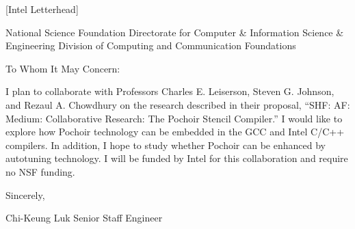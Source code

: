 [Intel Letterhead]

National Science Foundation
Directorate for Computer & Information Science & Engineering 
Division of Computing and Communication Foundations

To Whom It May Concern:

I plan to collaborate with Professors Charles E. Leiserson, Steven
G. Johnson, and Rezaul A. Chowdhury on the research described in their
proposal, ``SHF: AF: Medium: Collaborative Research: The Pochoir
Stencil Compiler.''  I would like to explore how Pochoir technology
can be embedded in the GCC and Intel C/C++ compilers.  In addition, I
hope to study whether Pochoir can be enhanced by autotuning
technology.  I will be funded by Intel for this collaboration and
require no NSF funding.

Sincerely,

Chi-Keung Luk
Senior Staff Engineer
